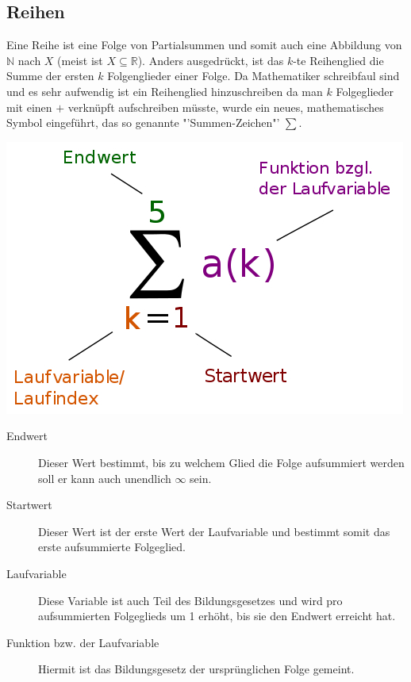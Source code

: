 \subsection{Reihen}
Eine Reihe ist eine Folge von Partialsummen und somit auch eine Abbildung von $\mathbb{N}$ nach $X$ (meist ist $X \subseteq \mathbb{R}$). Anders ausgedrückt, ist das $k$-te Reihenglied die Summe der ersten $k$ Folgenglieder einer Folge. Da Mathematiker schreibfaul sind und es sehr aufwendig ist ein Reihenglied hinzuschreiben da man $k$ Folgeglieder mit einen $+$ verknüpft aufschreiben müsste, wurde ein neues, mathematisches Symbol eingeführt, das so genannte "'Summen-Zeichen"' $\sum$.
\begin{minipage}{7 cm}
\includegraphics[width = 7 cm]{pictures/summe}
\begin{description}
\item[Endwert] Dieser Wert bestimmt, bis zu welchem Glied die Folge aufsummiert werden soll er kann auch unendlich $\infty$ sein.
\end{description}
\end{minipage}
\begin{minipage}{7 cm}
\begin{description}
\item[Startwert] Dieser Wert ist der erste Wert der Laufvariable und bestimmt somit das erste aufsummierte Folgeglied.
\item[Laufvariable] Diese Variable ist auch Teil des Bildungsgesetzes und wird pro aufsummierten Folgeglieds um 1 erhöht, bis sie den Endwert erreicht hat.
\item[Funktion bzw. der Laufvariable] Hiermit ist das Bildungsgesetz der ursprünglichen Folge gemeint.
\end{description}
\end{minipage}

